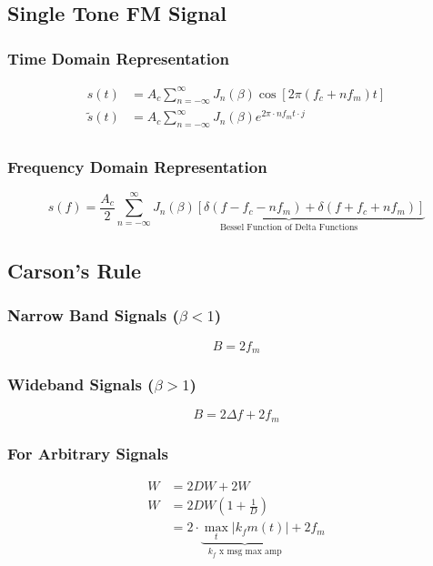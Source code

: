 \documentclass[10pt]{article}
\begin{document}
\subsection{Single Tone FM Signal}
\subsubsection{Time Domain Representation}
\begin{align*}
	s(t)         & = A_c \sum_{n=-\infty}^{\infty}  J_n(\beta)\cos\left[2 \pi (f_c + n f_m) t\right] \\
	\tilde{s}(t) & = A_c \sum_{n=-\infty}^{\infty} J_n(\beta) e^{2 \pi \cdot n f_m t \cdot j}        \\
\end{align*}
\subsubsection{Frequency Domain Representation}
\[
	s(f) = \frac{A_c}{2} \sum_{n=-\infty}^{\infty} \underbrace{J_n(\beta)\left[\delta(f-f_c-n f_m) + \delta(f+f_c+n f_m)\right]}_{\text{Bessel Function of Delta Functions}}
\]

\subsection{Carson's Rule}
\subsubsection{Narrow Band Signals ($\beta < 1$)}
\[
	B = 2 f_m
\]

\subsubsection{Wideband Signals ($\beta > 1$)}
\[
	B = 2 \Delta f + 2 f_m
\]
\subsubsection{For Arbitrary Signals}
\begin{align*}
	W & = 2 D W + 2 W                                                                            \\
	W & = 2DW(1 + \frac{1}{D})                                                                   \\
	  & = 2 \cdot \underbrace{\max_{t}\left|k_f m(t)\right|}_{\text{$k_f$ x msg max amp}} + 2 f_m
\end{align*}
\end{document}
